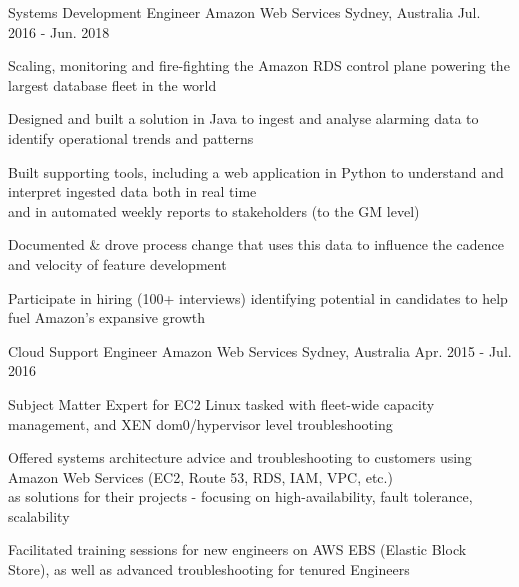 \begin{cventries}
  \cventry
    {Systems Development Engineer} %
    {Amazon Web Services} %
    {Sydney, Australia} %
    {Jul. 2016 - Jun. 2018} %
    {
      \begin{cvitems} %
        \item {Scaling, monitoring and fire-fighting the Amazon RDS control plane powering the largest database fleet in the world}
        \item {Designed and built a solution in Java to ingest and analyse alarming data to identify operational trends and patterns }
        \item {Built supporting tools, including a web application in Python to understand and interpret ingested data both in real time\\
        and in automated weekly reports to stakeholders (to the GM level)}
        \item {Documented \& drove process change that uses this data to influence the cadence and velocity of feature development }
        \item {Participate in hiring (100+ interviews) identifying potential in candidates to help fuel Amazon's expansive growth}
      \end{cvitems}
    }

  \cventry
    {Cloud Support Engineer} %
    {Amazon Web Services} %
    {Sydney, Australia} %
    {Apr. 2015 - Jul. 2016} %
    {
      \begin{cvitems} %
        \item {Subject Matter Expert for EC2 Linux tasked with fleet-wide capacity management, and XEN dom0/hypervisor level troubleshooting}
        \item {Offered systems architecture advice and troubleshooting to customers using Amazon Web Services (EC2, Route 53, RDS, IAM, VPC, etc.)\\
        as solutions for their projects - focusing on high-availability, fault tolerance, scalability}
        \item {Facilitated training sessions for new engineers on AWS EBS (Elastic Block Store), as well as advanced troubleshooting for tenured Engineers}
      \end{cvitems}
    }


\end{cventries}
